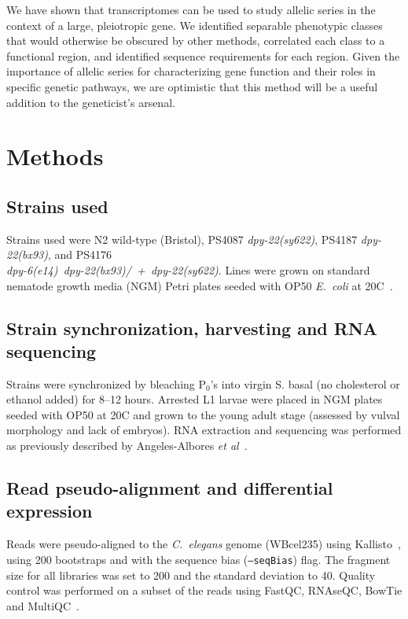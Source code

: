 \documentclass[8pt, twocolumn]{article}
\newcommand{\cel}{\emph{C.~elegans}}
\newcommand{\ecol}{\emph{E.~coli}}
\newcommand{\gene}[1]{\mbox{\emph{#1}}}
\newcommand{\dpy}[1]{\gene{dpy-22#1}}
\newcommand{\bx}{\dpy{(bx93)}}
\newcommand{\sy}{\dpy{(sy622)}}
\begin{document}
We have shown that transcriptomes can be used to study allelic series in the
context of a large, pleiotropic gene. We identified separable phenotypic classes
that would otherwise be obscured by other methods, correlated each class to a
functional region, and identified sequence requirements for each region. Given
the importance of allelic series for characterizing gene function and their
roles in specific genetic pathways, we are optimistic that this method will be a
useful addition to the geneticist's arsenal.


\section*{Methods}
\label{sec:methods}

\subsection*{Strains used}
Strains used were N2 wild-type (Bristol),
PS4087 \sy{},
PS4187 \bx{},
and PS4176\\ \gene{dpy-6(e14) dpy-22(bx93)/ + dpy-22(sy622)}.
Lines were grown on standard nematode growth media (NGM) Petri plates seeded
with OP50 \ecol{} at 20\degree{}C~\cite{Brenner1974}.

\subsection*{Strain synchronization, harvesting and RNA sequencing}
Strains were synchronized by bleaching P$_0$'s into virgin S. basal (no
cholesterol or ethanol added) for 8--12 hours. Arrested L1 larvae were placed in
NGM plates seeded with OP50 at 20\degree{}C and grown to the young adult stage
(assessed by vulval morphology and lack of embryos). RNA extraction and
sequencing was performed as previously described by Angeles-Albores
\emph{et al}~\cite{AngelesAlboresHIF,Angeles-Albores2017}.

\subsection*{Read pseudo-alignment and differential expression}
Reads were pseudo-aligned to the \cel{} genome (WBcel235) using
Kallisto~\cite{Bray2016}, using 200 bootstraps and with the sequence bias
(\texttt{--seqBias}) flag. The fragment size for all libraries was set to 200
and the standard deviation to 40. Quality control was performed on a subset of
the reads using FastQC, RNAseQC, BowTie and
MultiQC~\cite{Andrews2010,Deluca2012,Langmead2009,Ewels2016}.
\end{document}
